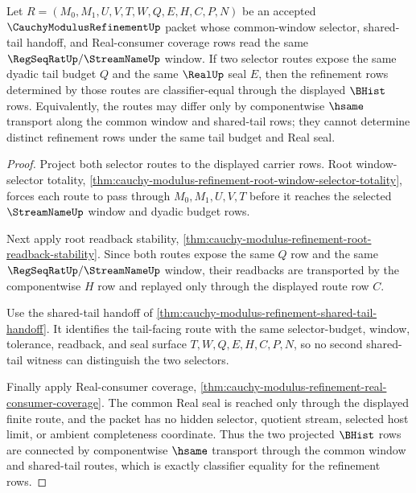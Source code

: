 \begin{theorem}
\label{thm:cauchy-modulus-refinement-shared-tail-selector-determinacy}
Let $R=(M_0,M_1,U,V,T,W,Q,E,H,C,P,N)$ be an accepted $\CauchyModulusRefinementUp$ packet whose common-window selector, shared-tail handoff, and Real-consumer coverage rows read the same $\RegSeqRatUp/\StreamNameUp$ window. If two selector routes expose the same dyadic tail budget $Q$ and the same $\RealUp$ seal $E$, then the refinement rows determined by those routes are classifier-equal through the displayed $\BHist$ rows. Equivalently, the routes may differ only by componentwise $\hsame$ transport along the common window and shared-tail rows; they cannot determine distinct refinement rows under the same tail budget and Real seal.
\end{theorem}
\begin{proof}
Project both selector routes to the displayed carrier rows. Root window-selector totality, \autoref{thm:cauchy-modulus-refinement-root-window-selector-totality}, forces each route to pass through $M_0,M_1,U,V,T$ before it reaches the selected $\StreamNameUp$ window and dyadic budget rows.

Next apply root readback stability, \autoref{thm:cauchy-modulus-refinement-root-readback-stability}. Since both routes expose the same $Q$ row and the same $\RegSeqRatUp/\StreamNameUp$ window, their readbacks are transported by the componentwise $H$ row and replayed only through the displayed route row $C$.

Use the shared-tail handoff of \autoref{thm:cauchy-modulus-refinement-shared-tail-handoff}. It identifies the tail-facing route with the same selector-budget, window, tolerance, readback, and seal surface $T,W,Q,E,H,C,P,N$, so no second shared-tail witness can distinguish the two selectors.

Finally apply Real-consumer coverage, \autoref{thm:cauchy-modulus-refinement-real-consumer-coverage}. The common Real seal is reached only through the displayed finite route, and the packet has no hidden selector, quotient stream, selected host limit, or ambient completeness coordinate. Thus the two projected $\BHist$ rows are connected by componentwise $\hsame$ transport through the common window and shared-tail routes, which is exactly classifier equality for the refinement rows.
\end{proof}

